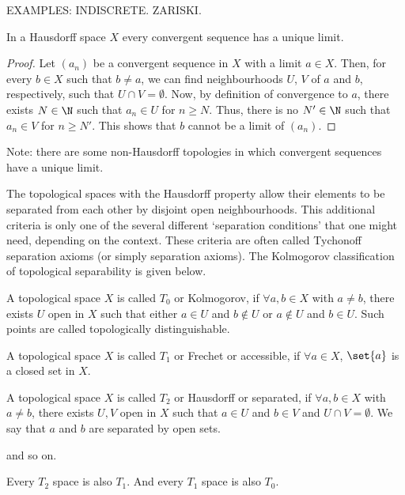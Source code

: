 EXAMPLES: INDISCRETE. ZARISKI.

\begin{nlemma}
  In a Hausdorff space $X$ every convergent sequence has a unique limit.
\end{nlemma}
\begin{proof}
  Let $(a_n)$ be a convergent sequence in $X$ with a limit $a \in X$. Then, for every $b \in X$ such that $b \neq a$, we can find neighbourhoods $U$, $V$ of $a$ and $b$, respectively, such that $U \cap V = \emptyset$. Now, by definition of convergence to $a$, there exists $N \in \N$ such that $a_n \in U$ for $n \geq N$. Thus, there is no $N' \in \N$ such that $a_n \in V$ for $n \geq N'$. This shows that $b$ cannot be a limit of $(a_n)$.
\end{proof}
Note: there are some non-Hausdorff topologies in which convergent sequences have a unique limit.

The topological spaces with the Hausdorff property allow their elements to be separated from each other by disjoint open neighbourhoods. This additional criteria is only one of the several different `separation conditions' that one might need, depending on the context. These criteria are often called Tychonoff separation axioms (or simply separation axioms). The Kolmogorov classification of topological separability is given below.
\begin{ndfn}[$T_{0}$ spaces]
  A topological space $X$ is called $T_0$ or Kolmogorov, if $\forall a, b \in X$ with $a \neq b$, there exists $U$ open in $X$ such that either $a \in U$ and $b \notin U$ or $a \notin U$ and $b \in U$. Such points are called topologically distinguishable.
\end{ndfn}

\begin{ndfn}[$T_{1}$ spaces]
  A topological space $X$ is called $T_1$ or Frechet or accessible, if $\forall a \in X$, $\set{a}$ is a closed set in $X$.
\end{ndfn}

\begin{ndfn}[$T_{2}$ spaces]
  A topological space $X$ is called $T_2$ or Hausdorff or separated, if $\forall a, b \in X$ with $a \neq b$, there exists $U, V$ open in $X$ such that $a \in U$ and $b \in V$ and $U \cap V = \emptyset$. We say that $a$ and $b$ are separated by open sets.
\end{ndfn}
and so on.

\begin{nlemma}
  Every $T_2$ space is also $T_1$. And every $T_1$ space is also $T_0$.
\end{nlemma}

